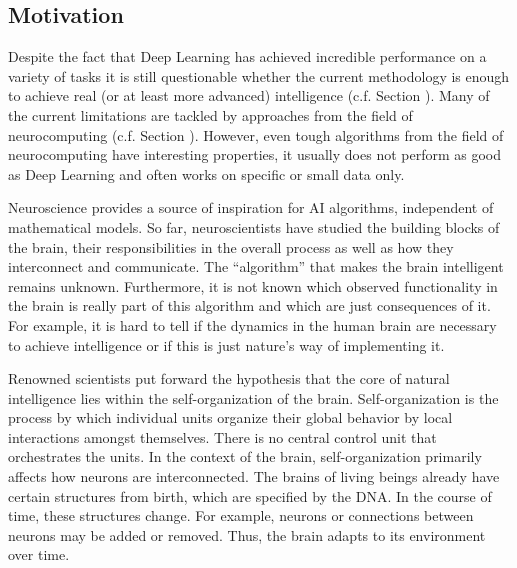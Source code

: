 \subsection{Motivation}
Despite the fact that Deep Learning has achieved incredible performance on a variety of tasks it is still questionable whether the current methodology is enough to achieve real (or at least more advanced) intelligence (c.f. Section ).
Many of the current limitations are tackled by approaches from the field of neurocomputing (c.f. Section ).
However, even tough algorithms from the field of neurocomputing  have interesting properties, it usually does not perform as good as Deep Learning and often works on specific or small data only.

Neuroscience provides a source of inspiration for AI algorithms, independent of mathematical models.
So far, neuroscientists have studied the building blocks of the brain, their responsibilities in the overall process as well as how they interconnect and communicate.
The ``algorithm'' that makes the brain intelligent remains unknown.
Furthermore, it is not known which observed functionality in the brain is really part of this algorithm and which are just consequences of it.
For example, it is hard to tell if the dynamics in the human brain are necessary to achieve intelligence or if this is just nature's way of implementing it.

Renowned scientists  put forward the hypothesis that the core of natural intelligence lies within the self-organization of the brain.
Self-organization is the process by which individual units organize their global behavior by local interactions amongst themselves.
There is no central control unit that orchestrates the units.
In the context of the brain, self-organization primarily affects how neurons are interconnected.
The brains of living beings already have certain structures from birth, which are specified by the DNA.
In the course of time, these structures change.
For example, neurons or connections between neurons may be added or removed.
Thus, the brain adapts to its environment over time.

